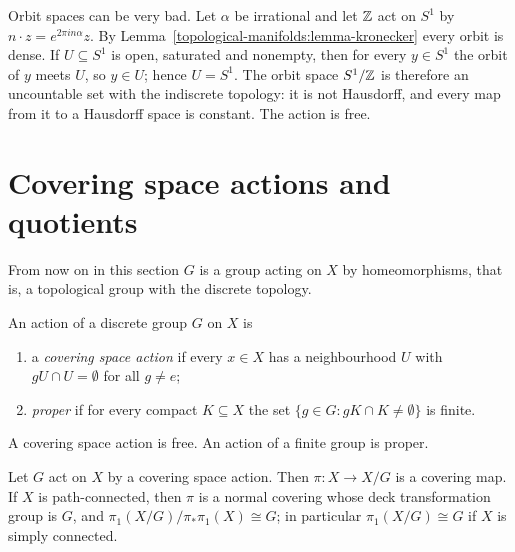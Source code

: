 \begin{counterexample}\label{topological-manifolds:counterexample-irrational-rotation}
Orbit spaces can be very bad. Let $\alpha$ be irrational and let $\mathbb{Z}$ act on $S^1$ by $n \cdot z = e^{2\pi in\alpha}z$. By Lemma~\ref{topological-manifolds:lemma-kronecker} every orbit is dense. If $U \subseteq S^1$ is open, saturated and
nonempty, then for every $y \in S^1$ the orbit of $y$ meets $U$, so $y \in U$; hence $U = S^1$. The orbit space $S^1/\mathbb{Z}$ is therefore an uncountable set with the indiscrete topology: it is not Hausdorff, and every map from it to a
Hausdorff space is constant. The action is free.
\end{counterexample}

\section{Covering space actions and quotients}\label{topological-manifolds:section-quotients}

From now on in this section $G$ is a group acting on $X$ by homeomorphisms, that is, a topological group with the discrete topology.

\begin{definition}\label{topological-manifolds:definition-covering-action}
An action of a discrete group $G$ on $X$ is
\begin{enumerate}
\item a \emph{covering space action} if every $x \in X$ has a neighbourhood $U$ with $gU \cap U = \emptyset$ for all $g \neq e$;
\item \emph{proper} if for every compact $K \subseteq X$ the set $\{g \in G : gK \cap K \neq \emptyset\}$ is finite.
\end{enumerate}
\end{definition}

A covering space action is free. An action of a finite group is proper.

\begin{theorem}\label{topological-manifolds:theorem-covering-action}
Let $G$ act on $X$ by a covering space action. Then $\pi \colon X \to X/G$ is a covering map. If $X$ is path-connected, then $\pi$ is a normal covering whose deck transformation group is $G$, and
$\pi_1(X/G)/\pi_*\pi_1(X) \cong G$; in particular $\pi_1(X/G) \cong G$ if $X$ is simply connected.
\end{theorem}

